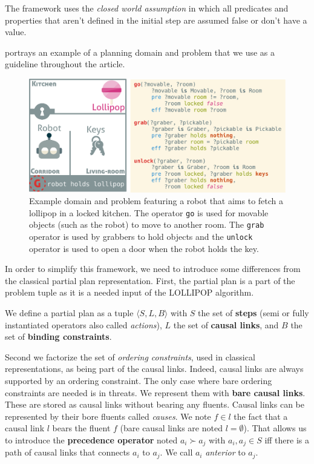 The framework uses the \emph{closed world assumption} in which all
predicates and properties that aren't defined in the initial step are
assumed false or don't have a value.

 portrays an example of a planning domain and problem
that we use as a guideline throughout the article.

\begin{figure}[htbp]
\centering
\includegraphics{graphics/example.pdf}
\caption{\label{fig:example}Example domain and problem featuring a robot
that aims to fetch a lollipop in a locked kitchen. The operator
\lstinline!go! is used for movable objects (such as the robot) to move
to another room. The \lstinline!grab! operator is used by grabbers to
hold objects and the \lstinline!unlock! operator is used to open a door
when the robot holds the key.}
\end{figure}

In order to simplify this framework, we need to introduce some
differences from the classical partial plan representation. First, the
partial plan is a part of the problem tuple as it is a needed input of
the LOLLIPOP algorithm.

\begin{definition}

We define a partial plan as a tuple \(\langle S, L, B\rangle\) with
\(S\) the set of \textbf{steps} (semi or fully instantiated operators
also called \emph{actions}), \(L\) the set of \textbf{causal links}, and
\(B\) the set of \textbf{binding constraints}.

\end{definition}

Second we factorize the set of \emph{ordering constraints}, used in
classical representations, as being part of the causal links. Indeed,
causal links are always supported by an ordering constraint. The only
case where bare ordering constraints are needed is in threats. We
represent them with \textbf{bare causal links}. These are stored as
causal links without bearing any fluents. Causal links can be
represented by their bore fluents called \emph{causes}. We note
\(f \in l\) the fact that a causal link \(l\) bears the fluent \(f\)
(bare causal links are noted \(l = \emptyset\)). That allows us to
introduce the \textbf{precedence operator} noted \(a_i \succ a_j\) with
\(a_i, a_j \in S\) iff there is a path of causal links that connects
\(a_i\) to \(a_j\). We call \(a_i\) \emph{anterior} to \(a_j\).

